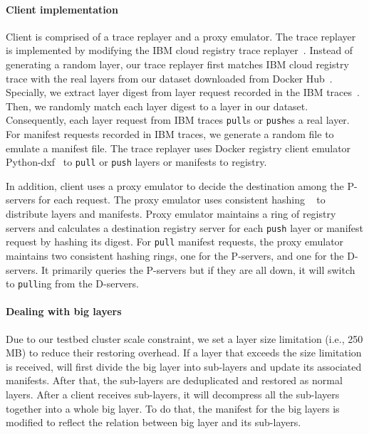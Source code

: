 
\paragraph{Client implementation}
Client is comprised of a trace replayer and 
a proxy emulator.
The trace replayer is implemented by modifying the IBM cloud registry trace replayer~\cite{dockerworkload}.
Instead of generating a random layer,
our trace replayer first matches IBM cloud registry trace with 
the real layers from our dataset downloaded from Docker Hub~\cite{dedupanalysis}.
Specially, we extract layer digest from layer request recorded in the IBM traces~\cite{dockerworkload}.
Then, 
we randomly match each layer digest to a layer in our dataset. 
Consequently, each layer request from IBM traces \texttt{pull}s or \texttt{push}es a real layer.
For manifest requests recorded in IBM traces, we generate a random file to emulate a manifest file.
The trace replayer uses Docker registry client emulator Python-dxf~\cite{pydxf} to 
\texttt{pull} or \texttt{push} layers or manifests to registry.

In addition, client uses a proxy emulator to decide the destination among the P-servers for each request.
The proxy emulator uses
consistent hashing ~\cite{kargercons} to distribute layers and manifests.
Proxy emulator maintains a ring of registry servers
and calculates a destination registry server for each \texttt{push} layer or manifest request
 by hashing its digest. For \texttt{pull} manifest requests, the proxy emulator maintains two consistent hashing rings, one for the P-servers, and one for the D-servers. It primarily queries the P-servers but if they are all down, it will switch to \texttt{pull}ing from the D-servers.

\paragraph{Dealing with big layers}
Due to our testbed cluster scale constraint,
we set a layer size limitation (i.e., 250 MB) to reduce their restoring overhead.
If a layer that exceeds the size limitation is received,
\sysname will first divide the big layer into sub-layers and update its associated manifests.
After that,
the sub-layers are deduplicated and restored as normal layers.
After a client receives sub-layers,   
it will decompress all the sub-layers together into a whole big layer.
To do that, the manifest for the big layers is 
modified to reflect the relation between big layer and its sub-layers.

